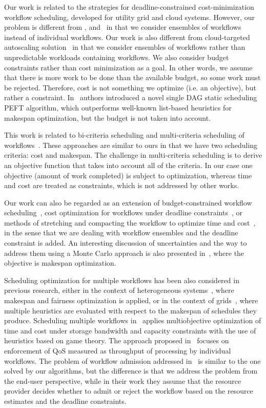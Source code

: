 \documentclass[preprint,5p]{elsarticle}
\begin{document}
Our work is related to the strategies for deadline-con\-strained
cost-minimization workflow scheduling, developed for utility grid and cloud
systems. However, our problem is different from
\cite{Yu2005},\cite{Abrishami2013158} and~\cite{Lee2013} in that we consider
ensembles of workflows instead of individual workflows.
Our work is also different from cloud-targeted autoscaling
solution~\cite{Mao2011} in that we consider ensembles of workflows rather than
unpredictable workloads containing workflows. We also consider budget
constraints rather than cost minimization as a goal. In other words, we assume
that there is more work to be done than the available budget, so some work must
be rejected.
Therefore, cost is not something we optimize (i.e. an objective), but rather a
constraint.
In~\cite{Arabnejad2014} authors introduced a novel single DAG static scheduling PEFT algorithm, 
which outperforms well-known list-based heuristics for makespan optimization, but the budget is not taken into account.


This work is related to bi-criteria scheduling and multi-criteria scheduling of
workflows~\cite{Wieczorek2009,Prodan2010,Dongarra2007,Durillo2013,Durillo2012}. These approaches are
similar to ours in that we have two scheduling criteria: cost and makespan. The
challenge in multi-criteria scheduling is to derive an objective function that
takes into account all of the criteria. In our case one objective (amount
of work completed) is subject to optimization, whereas time and cost are
treated as constraints, which is not addressed by other works.


Our work can also be regarded as an extension of budget-constrained 
workflow scheduling~\cite{Sakellariou2007}, cost optimization for workflows 
under deadline constraints~\cite{Yu2005}, 
or methods of stretching and compacting the workflow to optimize time and cost~\cite{Lee2013}, 
in the sense that we are dealing with workflow ensembles
and the deadline constraint is added. 
An interesting discussion of uncertainties and the way to address them using a Monte Carlo approach 
is also presented in~\cite{Zheng2013b}, where the objective is makespan optimization.  

Scheduling optimization for multiple workflows has been also considered in previous research, 
either in the context of heterogeneous systems~\cite{Zhao2006}, 
where makespan and fairness optimization is applied, 
or in the context of grids~\cite{Hirales2010}, 
where multiple heuristics are evaluated with respect to the makespan of schedules they produce. 
Scheduling multiple workflows in~\cite{Duan2012,Duan2014} applies multiobjective optimization 
of time and cost under storage bandwidth and capacity constraints with the use of heuristics based on game theory. 
The approach proposed in~\cite{TolosanaCalasanz20121300} focuses on enforcement of QoS 
measured as throughput of processing by individual workflows. 
The problem of workflow admission addressed in~\cite{Zheng2013a} is similar to the one solved by our algorithms, 
but the difference is that we address the problem from the end-user perspective, 
while in their work they assume that the resource provider decides 
whether to admit or reject the workflow based on the resource estimates and the deadline constraints.
\end{document}
